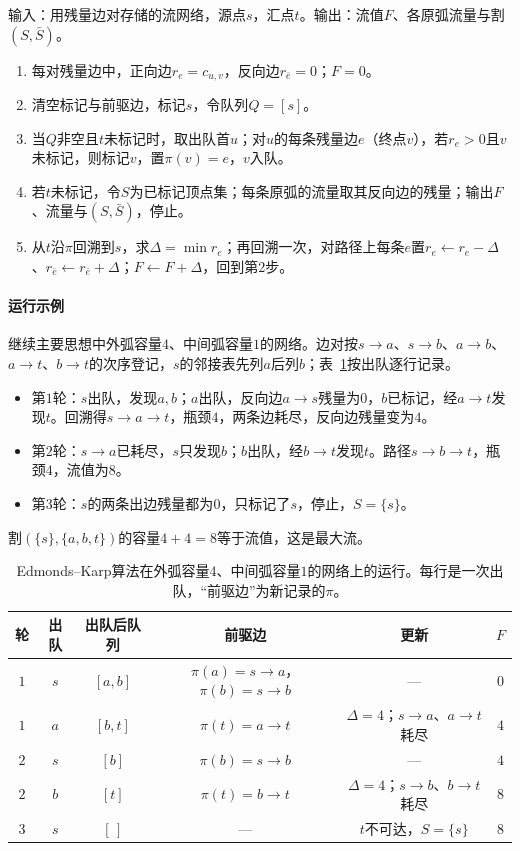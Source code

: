 \begin{algorithm}
\label{alg:graph-opt-edmonds-karp}
输入：用残量边对存储的流网络，源点$s$，汇点$t$。输出：流值$F$、各原弧流量与割$(S,\bar S)$。
\begin{enumerate}
  \item 每对残量边中，正向边$r_e=c_{u,v}$，反向边$r_{\bar e}=0$；$F=0$。
  \item 清空标记与前驱边，标记$s$，令队列$Q=[s]$。
  \item 当$Q$非空且$t$未标记时，取出队首$u$；对$u$的每条残量边$e$（终点$v$），若$r_e>0$且$v$未标记，则标记$v$，置$\pi(v)=e$，$v$入队。
  \item 若$t$未标记，令$S$为已标记顶点集；每条原弧的流量取其反向边的残量；输出$F$、流量与$(S,\bar S)$，停止。
  \item 从$t$沿$\pi$回溯到$s$，求$\Delta=\min r_e$；再回溯一次，对路径上每条$e$置$r_e\gets r_e-\Delta$、$r_{\bar e}\gets r_{\bar e}+\Delta$；$F\gets F+\Delta$，回到第2步。
\end{enumerate}
\end{algorithm}

\paragraph{运行示例}
继续主要思想中外弧容量$4$、中间弧容量$1$的网络。边对按$s\to a$、$s\to b$、$a\to b$、$a\to t$、$b\to t$的次序登记，$s$的邻接表先列$a$后列$b$；表~\ref{tab:graph-opt-edmonds-karp-trace}按出队逐行记录。
\begin{itemize}
  \item 第$1$轮：$s$出队，发现$a,b$；$a$出队，反向边$a\to s$残量为$0$，$b$已标记，经$a\to t$发现$t$。回溯得$s\to a\to t$，瓶颈$4$，两条边耗尽，反向边残量变为$4$。
  \item 第$2$轮：$s\to a$已耗尽，$s$只发现$b$；$b$出队，经$b\to t$发现$t$。路径$s\to b\to t$，瓶颈$4$，流值为$8$。
  \item 第$3$轮：$s$的两条出边残量都为$0$，只标记了$s$，停止，$S=\{s\}$。
\end{itemize}
割$(\{s\},\{a,b,t\})$的容量$4+4=8$等于流值，这是最大流。

\begin{table}[!htb]
  \centering
  \caption{Edmonds--Karp算法在外弧容量$4$、中间弧容量$1$的网络上的运行。每行是一次出队，“前驱边”为新记录的$\pi$。}
  \label{tab:graph-opt-edmonds-karp-trace}
  \begin{tabular}{@{}cccccc@{}}
    \toprule
    轮 & 出队 & 出队后队列 & 前驱边 & 更新 & $F$ \\
    \midrule
    $1$ & $s$ & $[a,b]$ & $\pi(a)=s\to a$，$\pi(b)=s\to b$ & — & $0$ \\
    $1$ & $a$ & $[b,t]$ & $\pi(t)=a\to t$ & $\Delta=4$；$s\to a$、$a\to t$耗尽 & $4$ \\
    $2$ & $s$ & $[b]$ & $\pi(b)=s\to b$ & — & $4$ \\
    $2$ & $b$ & $[t]$ & $\pi(t)=b\to t$ & $\Delta=4$；$s\to b$、$b\to t$耗尽 & $8$ \\
    $3$ & $s$ & $[\,]$ & — & $t$不可达，$S=\{s\}$ & $8$ \\
    \bottomrule
  \end{tabular}
\end{table}

